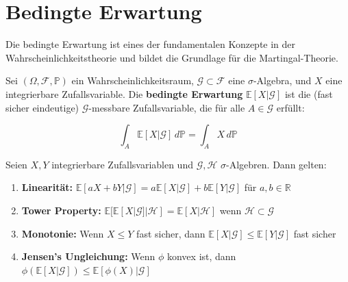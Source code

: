 \vspace{1cm}


\section{Bedingte Erwartung}

Die bedingte Erwartung ist eines der fundamentalen Konzepte in der Wahrscheinlichkeitstheorie und bildet die Grundlage für die Martingal-Theorie.

\begin{definition}
Sei $(\Omega, \mathcal{F}, \mathbb{P})$ ein Wahrscheinlichkeitsraum, $\mathcal{G} \subset \mathcal{F}$ eine $\sigma$-Algebra, und $X$ eine integrierbare Zufallsvariable. Die \textbf{bedingte Erwartung} $\mathbb{E}[X | \mathcal{G}]$ ist die (fast sicher eindeutige) $\mathcal{G}$-messbare Zufallsvariable, die für alle $A \in \mathcal{G}$ erfüllt:

\begin{equation}
\int_A \mathbb{E}[X | \mathcal{G}] \, d\mathbb{P} = \int_A X \, d\mathbb{P}
\end{equation}
\end{definition}

\begin{theorem}
Seien $X, Y$ integrierbare Zufallsvariablen und $\mathcal{G}, \mathcal{H}$ $\sigma$-Algebren. Dann gelten:

\begin{enumerate}
    \item \textbf{Linearität:} $\mathbb{E}[aX + bY | \mathcal{G}] = a\mathbb{E}[X | \mathcal{G}] + b\mathbb{E}[Y | \mathcal{G}]$ für $a, b \in \mathbb{R}$
    \item \textbf{Tower Property:} $\mathbb{E}[\mathbb{E}[X | \mathcal{G}] | \mathcal{H}] = \mathbb{E}[X | \mathcal{H}]$ wenn $\mathcal{H} \subset \mathcal{G}$
    \item \textbf{Monotonie:} Wenn $X \leq Y$ fast sicher, dann $\mathbb{E}[X | \mathcal{G}] \leq \mathbb{E}[Y | \mathcal{G}]$ fast sicher
    \item \textbf{Jensen's Ungleichung:} Wenn $\phi$ konvex ist, dann $\phi(\mathbb{E}[X | \mathcal{G}]) \leq \mathbb{E}[\phi(X) | \mathcal{G}]$
\end{enumerate}
\end{theorem}

